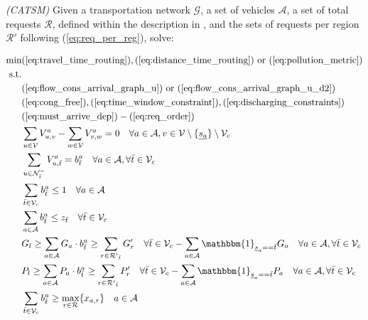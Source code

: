 \begin{algori}{\textit{(CATSM)}}
	Given a transportation network $\mathcal{G}$, a set of vehicles $\mathcal{A}$, a set of total requests $\mathcal{R}$, defined within the description in , and the sets of requests per region $\mathcal{R}'$ following (\ref{eq:req_per_reg}), solve: \\
\end{algori}
\begin{align}
	\text{min}&  
		(\ref{eq:travel_time_routing}), (\ref{eq:distance_time_routing}) \text{ or } (\ref{eq:pollution_metric})
	\nonumber\\
	\text{s.t.} &\nonumber\\
	&(\ref{eq:flow_cons_arrival_graph_u}) \text{ or } (\ref{eq:flow_cons_arrival_graph_u_d2})\nonumber\\%
	&(\ref{eq:cong_free}),(\ref{eq:time_window_constraint}),(\ref{eq:discharging_constraints})\nonumber\\
	&(\ref{eq:must_arrive_dep})-(\ref{eq:req_order})\nonumber\\
	&\sum_{u \in \mathcal{V}} V^a_{u, v} - \sum_{w \in \mathcal{V}} V^a_{v, w} = 0 \quad \forall a \in \mathcal{A}, v \in \mathcal{V} \setminus \{\underline{s_a}\}\setminus\mathcal{V}_c  \label{eq:flow_conservation_graph_u2} \\	
	&\sum_{ u \in \mathcal{N}^-_{\bar{t}} }V^a_{u, \bar{t}} = b_{\bar{t}}^a \quad \forall a \in \mathcal{A},\forall \bar{t} \in \mathcal{V}_c  \label{eq:each_vehicle_end2}\\
	 &\sum_{\bar{t}\in \mathcal{V}_c} b_{\bar{t}}^a \leq 1\quad \forall a \in \mathcal{A}
	 \label{eq:one_depot_vehicle}\\
	&\sum_{a \in \mathcal{A}}b_{\bar{t}}^a  \leq z_{\bar{t}} \quad \forall \bar{t} \in \mathcal{V}_c \label{eq:capacity_depot_respected2}\\
	&G_{l}\ge\sum_{a \in \mathcal{A}} G_a \cdot b_{\bar{t}}^a \ge \sum_{r \in \mathcal{R'}_{\bar{t}}} G'_r \quad \forall \bar{t} \in \mathcal{V}_c - \sum_{a \in \mathcal{A}} \mathbbm{1}_{\underline{s}_a == \bar{t}}G_a  \quad \forall a \in \mathcal{A},\forall \bar{t} \in \mathcal{V}_c\label{eq:goods_cap2}\\
	&P_{l}\ge\sum_{a \in \mathcal{A}}P_a \cdot b_{\bar{t}}^a\ge \sum_{r \in \mathcal{R'}_{\bar{t}}} P'_r \quad \forall \bar{t} \in \mathcal{V}_c - \sum_{a \in \mathcal{A}} \mathbbm{1}_{\underline{s}_a == \bar{t}}P_a \quad \forall a \in \mathcal{A},\forall \bar{t} \in \mathcal{V}_c	\label{eq:people_cap2}\\
	&\sum_{\bar{t} \in \mathcal{V}_c}b_{\bar{t}}^a   \ge \underset{ r \in \mathcal{R}}{\max}\{x_{a,r}\}  \quad a \in \mathcal{A} \label{eq:rebalancing_moving}
\end{align}

